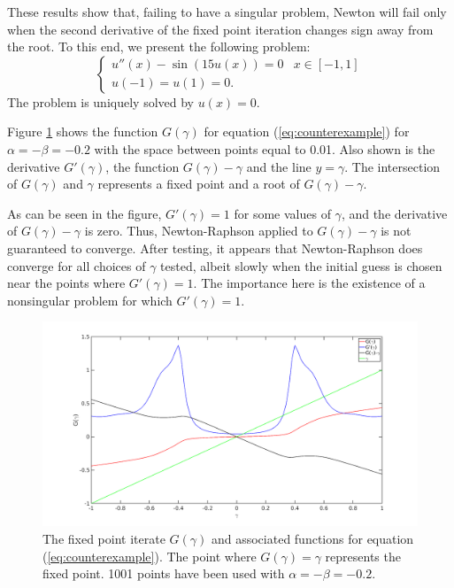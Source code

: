 \documentclass{book}
\begin{document}
These results show that, failing to have a singular problem, Newton will fail only when the second derivative of the fixed point iteration changes sign away from the root.
To this end, we present the following problem:
\begin{equation}
\label{eq:counterexample}
\begin{cases} u''(x) - \sin \left ( 15 u(x) \right ) = 0 & x \in [-1,1] \\
u(-1) = u(1) = 0 . \end{cases}
\end{equation}
The problem is uniquely solved by $u(x) = 0$.

Figure \ref{fig:exp8} shows the function $G(\gamma)$ for equation (\ref{eq:counterexample}) for $\alpha = - \beta = -0.2$ with the space between points equal to 0.01.
Also shown is the derivative $G'(\gamma)$, the function $G(\gamma) - \gamma$ and the line $y = \gamma$.
The intersection of $G(\gamma)$ and $\gamma$ represents a fixed point and a root of $G(\gamma) - \gamma$.

As can be seen in the figure, $G'(\gamma) = 1$ for some values of $\gamma$, and the derivative of $G(\gamma) - \gamma$ is zero.
Thus, Newton-Raphson applied to $G(\gamma) - \gamma$ is not guaranteed to converge.
After testing, it appears that Newton-Raphson does converge for all choices of $\gamma$ tested, albeit slowly when the initial guess is chosen near the points where $G'(\gamma) = 1$.
The importance here is the existence of a nonsingular problem for which $G'(\gamma) = 1$.

\begin{figure}
\centering
\includegraphics[width=\textwidth]{exp8_01.png}
\caption{The fixed point iterate $G(\gamma)$ and associated functions for equation (\ref{eq:counterexample}).
The point where $G(\gamma) = \gamma$ represents the fixed point.
1001 points have been used with $\alpha = -\beta = -0.2$.}
\label{fig:exp8}
\end{figure}
\end{document}
